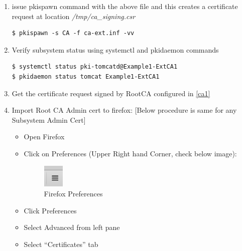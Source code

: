 \documentclass[12pt]{report}
\begin{document}
\begin{enumerate}[label*=\arabic*.]
\begin{enumerate}[label*=\arabic*.]
\begin{lstlisting}[style=configFile]
[CA]
pki_external=True
pki_external_csr_path=/tmp/ca_signing.csr
pki_ca_signing_subject_dn=cn=CA Signing, ou=External,o=example.org
pki_ds_hostname=pki1.example.org
pki_ds_ldap_port=2389
pki_ds_password=Secret123
pki_ds_secure_connection=False
                        \end{lstlisting}
                    \item \label{ca3.2} issue pkispawn command with the above file and this creates a certificate request at location \textit{/tmp/ca\_signing.csr}
                        \begin{lstlisting}[style=bashInputStyle]
$ pkispawn -s CA -f ca-ext.inf -vv
                        \end{lstlisting}
                    \item Verify subsystem status using systemctl and pkidaemon commands
                    \begin{lstlisting}[style=bashInputStyle]
$ systemctl status pki-tomcatd@Example1-ExtCA1
$ pkidaemon status tomcat Example1-ExtCA1
                    \end{lstlisting}
                    \item Get the certificate request signed by RootCA configured in \ref{ca1}
                    \item \label{import_admin_p12} Import Root CA Admin cert to firefox: [Below procedure is same for any Subsystem Admin Cert]
                        \begin{itemize}
                            \item Open Firefox
                            \item Click on Preferences (Upper Right hand Corner, check below image):
                                \begin{figure}[H]
                                    \centering
                                    \includegraphics[width=10mm]{Images/firefox-certificates1.png}
                                    \caption{Firefox Preferences}
                                \end{figure}
                            \item Click Preferences
                            \item Select Advanced from left pane
                            \item Select ``Certificates'' tab

\end{itemize}
\end{enumerate}
\end{enumerate}
\end{document}
